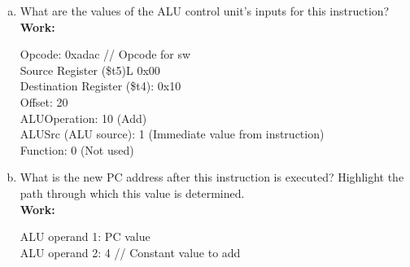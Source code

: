 \documentclass[11pt]{article}
\begin{document}
\begin{enumerate}[(a)]
    \item What are the values of the ALU control unit's inputs for this instruction?\\
    \textbf{Work:}
    \begin{center}
        Opcode: 0xadac // Opcode for sw\\
        Source Register (\$t5)L 0x00\\
        Destination Register (\$t4): 0x10\\
        Offset: 20\\
        ALUOperation: 10 (Add)\\
        ALUSrc (ALU source): 1 (Immediate value from instruction)\\
        Function: 0 (Not used)\\
    \end{center}

    \item What is the new PC address after this instruction is executed? Highlight the path through which this value is determined.\\
    \textbf{Work:}
    \begin{center}
        ALU operand 1: PC value\\
        ALU operand 2: 4 // Constant value to add \\
    \end{center}


\end{enumerate}
\end{document}
